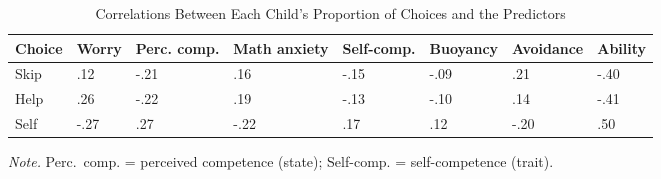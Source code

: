 \documentclass[
  man,
  floatsintext,
  longtable,
  nolmodern,
  notxfonts,
  notimes,
  colorlinks=true,linkcolor=blue,citecolor=blue,urlcolor=blue]{apa7}
\makeatletter
\renewenvironment{longtable}[1][]%
    {\par\vspace{24pt}\noindent\begin{tabular}}%
    {\bottomrule\end{tabular}\par\vspace{24pt}}%
\let\endhead\apa@gobblefoot}
\makeatother
\begin{document}
\begin{table}

{\caption{{Correlations Between Each Child's Proportion of Choices and
the Predictors}{\label{tbl-bivar}}}
\vspace{-20pt}}

\begin{longtable}[]{@{}
  >{\raggedright\arraybackslash}p{}
  >{\raggedleft\arraybackslash}p{}
  >{\raggedleft\arraybackslash}p{}
  >{\raggedleft\arraybackslash}p{}
  >{\raggedleft\arraybackslash}p{}
  >{\raggedleft\arraybackslash}p{}
  >{\raggedleft\arraybackslash}p{}
  >{\raggedleft\arraybackslash}p{}@{}}
\toprule\noalign{}
\begin{minipage}[b]{\linewidth}\raggedright
Choice
\end{minipage} & \begin{minipage}[b]{\linewidth}\raggedleft
Worry
\end{minipage} & \begin{minipage}[b]{\linewidth}\raggedleft
Perc. comp.
\end{minipage} & \begin{minipage}[b]{\linewidth}\raggedleft
Math anxiety
\end{minipage} & \begin{minipage}[b]{\linewidth}\raggedleft
Self-comp.
\end{minipage} & \begin{minipage}[b]{\linewidth}\raggedleft
Buoyancy
\end{minipage} & \begin{minipage}[b]{\linewidth}\raggedleft
Avoidance
\end{minipage} & \begin{minipage}[b]{\linewidth}\raggedleft
Ability
\end{minipage} \\
\midrule\noalign{}
\endhead
\bottomrule\noalign{}
\endlastfoot
Skip & .12 & -.21 & .16 & -.15 & -.09 & .21 & -.40 \\
Help & .26 & -.22 & .19 & -.13 & -.10 & .14 & -.41 \\
Self & -.27 & .27 & -.22 & .17 & .12 & -.20 & .50 \\
\end{longtable}

\vspace{-20pt}
\noindent \emph{Note.} Perc.~comp. = perceived competence (state);
Self-comp. = self-competence (trait).

\end{table}
\end{document}
